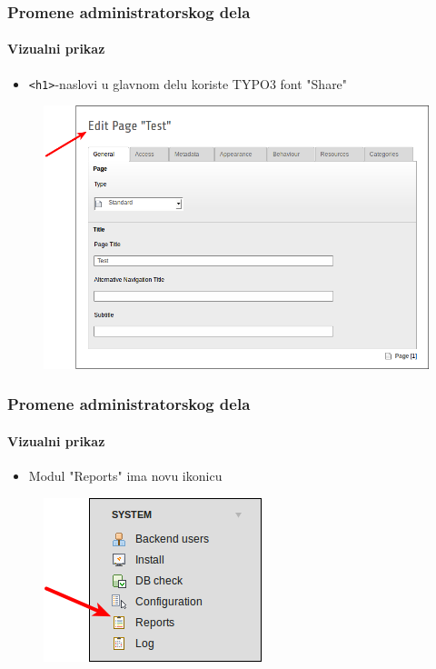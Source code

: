 
\begin{frame}[fragile]
	\frametitle{Promene administratorskog dela}
	\framesubtitle{Vizualni prikaz}

	\begin{itemize}
		\item \texttt{<h1>}-naslovi u glavnom delu koriste TYPO3 font "Share"
	\end{itemize}

	\begin{figure}
		\includegraphics[width=0.6\linewidth]{Images/BackendChanges/ConsistantFont.png}
	\end{figure}

\end{frame}


\begin{frame}[fragile]
	\frametitle{Promene administratorskog dela}
	\framesubtitle{Vizualni prikaz}

	\begin{itemize}
		\item Modul "Reports" ima novu ikonicu
	\end{itemize}

	\begin{figure}
		\includegraphics[width=0.35\linewidth]{Images/BackendChanges/ModuleReportsIcon.png}
	\end{figure}

\end{frame}

